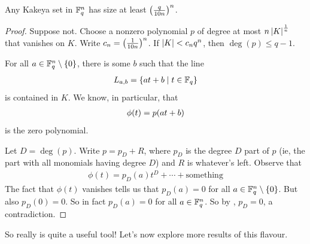 \begin{boxtheorem}
    Any Kakeya set in $\mathbb{F}_q^n$ has size at least $\left( \frac{q}{10n} \right)^n$.
\end{boxtheorem}
\begin{proof}
    Suppose not. Choose a nonzero polynomial $p$ of degree at most $n\left\lvert K \right\rvert^{\frac{1}{n}}$ that vanishes on $K$. Write $c_n = \left( \frac{1}{10n} \right)^n$. If $\left\lvert K \right\rvert < c_n q^n$, then $\deg(p) \leq q - 1$.

    For all $a \in \mathbb{F}_q^n \setminus \left\{ 0 \right\}$, there is some $b$ such that the line
    \begin{align*}
        L_{a, b} = \left\{ at + b \; \middle\vert \; t \in \mathbb{F}_q \right\}
    \end{align*}
    is contained in $K$. We know, in particular, that
    \begin{align*}
        \phi(t) = p\!\left( at + b \right)
    \end{align*}
    is the zero polynomial.

    Let $D = \deg(p)$. Write $p = p_D + R$, where $p_D$ is the degree $D$ part of $p$ (ie, the part with all monomials having degree $D$) and $R$ is whatever's left. Observe that
    \begin{align*}
        \phi(t) = p_D(a) t^D + \cdots + \text{something}
    \end{align*}
    The fact that $\phi(t)$ vanishes tells us that $p_D(a) = 0$ for all $a \in \mathbb{F}_q^n \setminus \left\{ 0 \right\}$. But also $p_D(0) = 0$. So in fact $p_D(a) = 0$ for all $a \in \mathbb{F}_q^n$. So by , $p_D = 0$, a contradiction.
\end{proof}

So  really is quite a useful tool! Let's now explore more results of this flavour.
